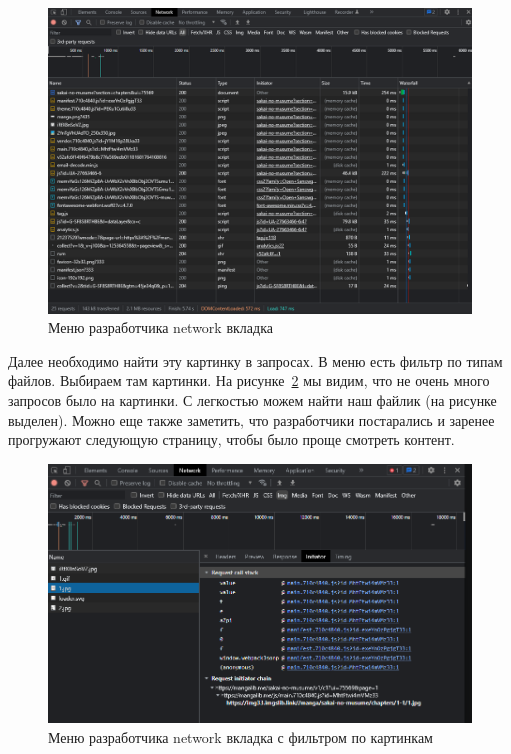 \begin{figure}
    \includegraphics[scale=0.5]{imgs/network-example}
    \caption{Меню разработчика network вкладка}
    \label{chrome-tools-network}
\end{figure}

Далее необходимо найти эту картинку в запросах. В меню есть фильтр по типам файлов. Выбираем там картинки.
На рисунке~\ref{chrome-tools-network-pics} мы видим, что не очень много запросов было на картинки.
С легкостью можем найти наш файлик (на рисунке выделен).
Можно еще также заметить, что разработчики постарались и заренее прогружают следующую страницу, чтобы было проще смотреть контент.

\begin{figure}
    \includegraphics[scale=0.5]{imgs/network-pics}
    \caption{Меню разработчика network вкладка с фильтром по картинкам}
    \label{chrome-tools-network-pics}
\end{figure}


